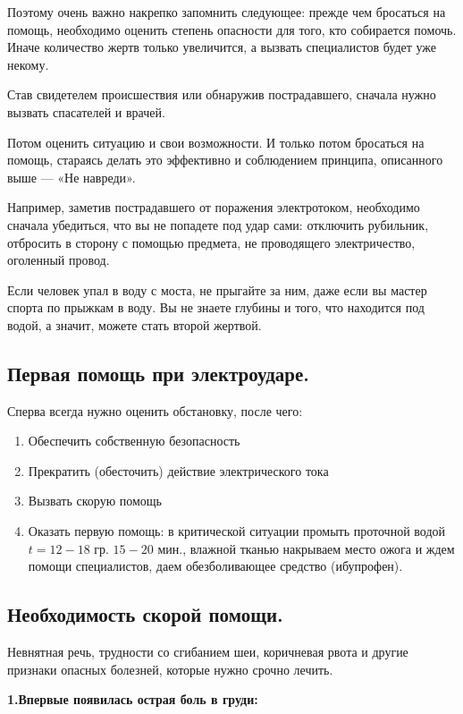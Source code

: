 \documentclass[a4paper, 12pt]{article}
\theoremstyle{definition}
\begin{document}
        Поэтому очень важно накрепко запомнить следующее: прежде чем бросаться на помощь, необходимо оценить степень опасности для того, кто собирается помочь. Иначе количество жертв только увеличится, а вызвать специалистов будет уже некому.

        Став свидетелем происшествия или обнаружив пострадавшего, сначала нужно вызвать спасателей и врачей. 

        Потом оценить ситуацию и свои возможности. И только потом бросаться на помощь, стараясь делать это эффективно и соблюдением принципа, описанного выше — «Не навреди».

        Например, заметив пострадавшего от поражения электротоком, необходимо сначала убедиться, что вы не попадете под удар сами: отключить рубильник, отбросить в сторону с помощью предмета, не проводящего электричество, оголенный провод.

        Если человек упал в воду с моста, не прыгайте за ним, даже если вы мастер спорта по прыжкам в воду. Вы не знаете глубины и того, что находится под водой, а значит, можете стать второй жертвой.

        \subsection{Первая помощь при электроударе.}
        Сперва всегда нужно оценить обстановку, после чего:
        \begin{enumerate}
            \item Обеспечить собственную безопасность
            \item Прекратить (обесточить) действие электрического тока
            \item Вызвать скорую помощь
            \item Оказать первую помощь: в критической ситуации промыть проточной водой $t=12-18$ гр. $15-20$ мин., влажной тканью накрываем место ожога и ждем помощи специалистов, даем обезболивающее средство (ибупрофен).
        \end{enumerate}
        \subsection{Необходимость скорой помощи.}

        Невнятная речь, трудности со сгибанием шеи, коричневая рвота и другие признаки опасных болезней, которые нужно срочно лечить.

        \textbf{1.Впервые появилась острая боль в груди:}
\end{document}
